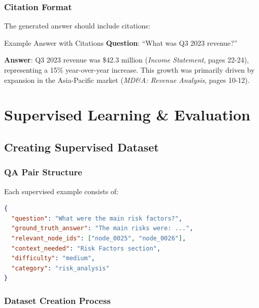 \subsubsection{Citation Format}

The generated answer should include citations:

\begin{examplebox}{Example Answer with Citations}
\textbf{Question}: ``What was Q3 2023 revenue?''

\textbf{Answer}:
Q3 2023 revenue was \$42.3 million (\textit{Income Statement}, pages 22-24), representing a 15\% year-over-year increase. This growth was primarily driven by expansion in the Asia-Pacific market (\textit{MD\&A: Revenue Analysis}, pages 10-12).
\end{examplebox}

\section{Supervised Learning \& Evaluation}

\subsection{Creating Supervised Dataset}

\subsubsection{QA Pair Structure}

Each supervised example consists of:

\begin{lstlisting}[language=json, caption=Supervised QA Pair Format]
{
  "question": "What were the main risk factors?",
  "ground_truth_answer": "The main risks were: ...",
  "relevant_node_ids": ["node_0025", "node_0026"],
  "context_needed": "Risk Factors section",
  "difficulty": "medium",
  "category": "risk_analysis"
}
\end{lstlisting}

\subsubsection{Dataset Creation Process}

